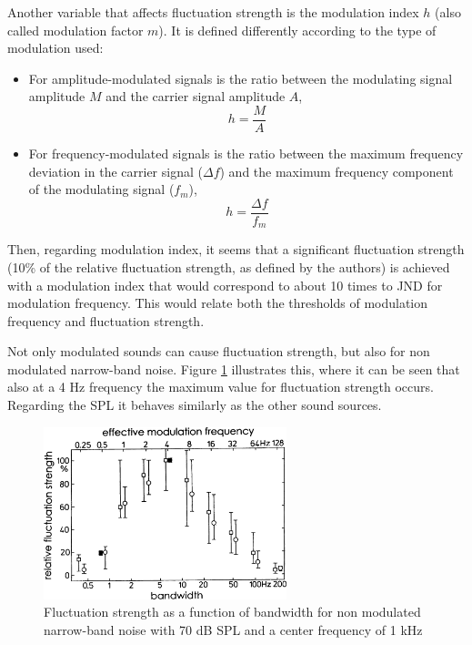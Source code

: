 Another variable that affects fluctuation strength is the modulation index $h$
(also called modulation factor $m$). It is defined differently according to the
type of modulation used:
\begin{itemize}
    \item For amplitude-modulated signals is the ratio between the modulating
        signal amplitude $M$ and the carrier signal amplitude $A$,
        \begin{equation}
            h=\frac{M}{A}
        \end{equation}
    \item For frequency-modulated signals is the ratio between the maximum
        frequency deviation in the carrier signal ($\Delta f$) and the maximum
        frequency component of the modulating signal ($f_m$),
        \begin{equation}
            h=\frac{\Delta f}{f_m}
        \end{equation}
\end{itemize}

Then, regarding modulation index, it seems that a significant fluctuation
strength (10\% of the relative fluctuation strength, as defined by the authors)
is achieved with a modulation index that would correspond to about 10 times to
JND for modulation frequency. This would relate both the thresholds of
modulation frequency and fluctuation strength.

Not only modulated sounds can cause fluctuation strength, but also for non
modulated narrow-band noise. Figure \ref{fig:flucstrenvsbandwith} illustrates
this, where it can be seen that also at a 4 Hz frequency the maximum value for
fluctuation strength occurs. Regarding the SPL it behaves similarly as the other
sound sources.

\begin{figure}
    \centering
    \includegraphics[height=5cm]
        {img/FluctuationStrengthvsBandwidth}
    \caption{Fluctuation strength as a function of bandwidth for non modulated
        narrow-band noise with 70 dB SPL and a center frequency of 1 kHz
        \cite[pp. 252]{Fastl2007Psychoacoustics}}
    \label{fig:flucstrenvsbandwith}
\end{figure}

